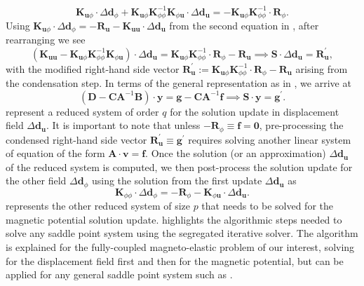 \documentclass[11pt,a4paper,final]{article}
\begin{document}
\begin{equation}
\mathbf{K}_{\mathbf{u} \phi} \cdot \Delta \mathbf{d}_{\phi} +  \mathbf{K}_{\mathbf{u} \phi} \mathbf{K}_{\phi \phi}^{-1} \mathbf{K}_{\phi \mathbf{u}} \cdot \Delta \mathbf{d}_{\mathbf{u}} = -\mathbf{K}_{\mathbf{u} \phi} \mathbf{K}_{\phi \phi}^{-1} \cdot \mathbf{R}_{\phi}.
\end{equation}
Using $\mathbf{K}_{\mathbf{u} \phi} \cdot \Delta \mathbf{d}_{\phi} = -\mathbf{R}_{\mathbf{u}} - \mathbf{K}_{\mathbf{u} \mathbf{u}} \cdot \Delta \mathbf{d}_{\mathbf{u}}$ from the second equation in , after rearranging we see
\begin{equation}
\left( \mathbf{K}_{\mathbf{u} \mathbf{u}} - \mathbf{K}_{\mathbf{u} \phi} \mathbf{K}_{\phi \phi}^{-1} \mathbf{K}_{\phi \mathbf{u}} \right) \cdot \Delta \mathbf{d}_{\mathbf{u}} = \mathbf{K}_{\mathbf{u} \phi} \mathbf{K}_{\phi \phi}^{-1} \cdot \mathbf{R}_{\phi} - \mathbf{R}_{\mathbf{u}} \implies \mathbf{S} \cdot \Delta \mathbf{d}_{\mathbf{u}} = \mathbf{R}_{\mathbf{u}}^',
\label{eq:3.19}
\end{equation}
with the modified right-hand side vector $\mathbf{R}_{\mathbf{u}}^' := \mathbf{K}_{\mathbf{u} \phi} \mathbf{K}_{\phi \phi}^{-1} \cdot \mathbf{R}_{\phi} - \mathbf{R}_{\mathbf{u}}$ arising from the condensation step.
In terms of the general representation as in , we arrive at
\begin{equation}
\left( \mathbf{D} - \mathbf{C} \mathbf{A}^{-1} \mathbf{B} \right) \cdot \mathbf{y} = \mathbf{g} - \mathbf{C} \mathbf{A}^{-1} \mathbf{f} \implies \mathbf{S} \cdot \mathbf{y} = \mathbf{g}^'.
\label{eq:3.20} 
\end{equation}
 represent a reduced system of order $q$ for the solution update in displacement field $\Delta \mathbf{d}_{\mathbf{u}}$. It is important to note that unless $-\mathbf{R}_{\phi} \equiv \mathbf{f} = \mathbf{0}$, pre-processing the condensed right-hand side vector $\mathbf{R}_{\mathbf{u}}^' \equiv \mathbf{g}^'$ requires solving another linear system of equation of the form $\mathbf{A} \cdot \mathbf{v} = \mathbf{f}$. Once the solution (or an approximation) $\Delta \mathbf{d}_{\mathbf{u}}$ of the reduced system  is computed, we then post-process the solution update for the other field $\Delta \mathbf{d}_{\phi}$ using the solution from the first update $\Delta \mathbf{d}_{\mathbf{u}}$ as
\begin{equation}
\mathbf{K}_{\phi \phi} \cdot \Delta \mathbf{d}_{\phi} = -\mathbf{R}_{\phi} - \mathbf{K}_{\phi \mathbf{u}} \cdot \Delta \mathbf{d}_{\mathbf{u}}.
\label{eq:3.21}
\end{equation}
 represents the other reduced system of size $p$ that needs to be solved for the magnetic potential solution update.  highlights the algorithmic steps needed to solve any saddle point system using the segregated iterative solver. The algorithm is explained for the fully-coupled magneto-elastic problem of our interest, solving for the displacement field first and then for the magnetic potential, but can be applied for any general saddle point system such as .
\end{document}

